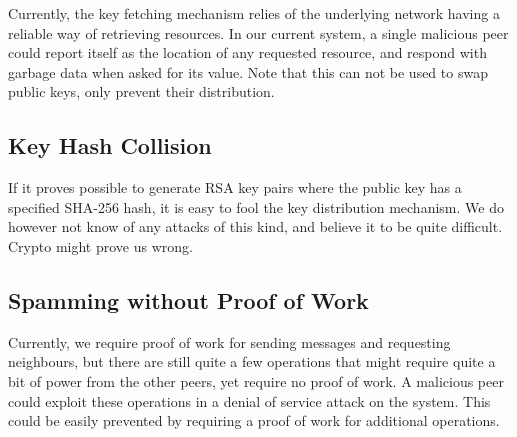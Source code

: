 Currently, the key fetching mechanism relies of the underlying network having a reliable way of retrieving resources. In our current system, a single malicious peer could report itself as the location of any requested resource, and respond with garbage data when asked for its value. Note that this can not be used to swap public keys, only prevent their distribution.

\subsection{Key Hash Collision}

If it proves possible to generate RSA key pairs where the public key has a specified SHA-256 hash, it is easy to fool the key distribution mechanism. We do however not know of any attacks of this kind, and believe it to be quite difficult. Crypto might prove us wrong.

\subsection{Spamming without Proof of Work}

Currently, we require proof of work for sending messages and requesting neighbours, but there are still quite a few operations that might require quite a bit of power from the other peers, yet require no proof of work. A malicious peer could exploit these operations in a denial of service attack on the system. This could be easily prevented by requiring a proof of work for additional operations. 
